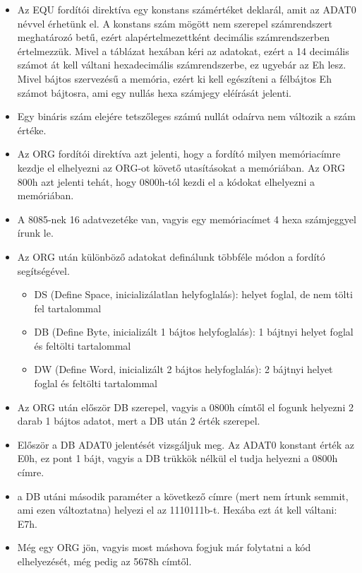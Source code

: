 \documentclass{article}
\begin{document}
\begin{itemize}
	\item Az EQU fordítói direktíva egy konstans számértéket deklarál, amit az ADAT0 névvel érhetünk el. A konstans szám mögött nem szerepel számrendszert meghatározó betű, ezért alapértelmezettként decimális számrendszerben értelmezzük. Mivel a táblázat hexában kéri az adatokat, ezért a 14 decimális számot át kell váltani hexadecimális számrendszerbe, ez ugyebár az Eh lesz. Mivel bájtos szervezésű a memória, ezért ki kell egészíteni a félbájtos Eh számot bájtosra, ami egy nullás hexa számjegy eléírását jelenti.
	\item \colorbox{orange!30}{Egy bináris szám elejére tetszőleges számú nullát odaírva nem változik a szám értéke.}
	\item Az ORG fordítói direktíva azt jelenti, hogy a fordító milyen memóriacímre kezdje el elhelyezni az ORG-ot követő utasításokat a memóriában. Az ORG 800h azt jelenti tehát, hogy 0800h-tól kezdi el a kódokat elhelyezni a memóriában.
	\item \colorbox{orange!30}{A 8085-nek 16 adatvezetéke van, vagyis egy memóriacímet 4 hexa számjeggyel írunk le.}
	\item Az ORG után különböző adatokat definálunk többféle módon a fordító segítségével.
	\begin{itemize}
		\item DS (Define Space, inicializálatlan helyfoglalás): helyet foglal, de nem tölti fel tartalommal
		\item DB (Define Byte, inicializált 1 bájtos helyfoglalás): 1 bájtnyi helyet foglal és feltölti tartalommal
		\item DW (Define Word, inicializált 2 bájtos helyfoglalás): 2 bájtnyi helyet foglal és feltölti tartalommal
	\end{itemize}
	\item Az ORG után először DB szerepel, vagyis a 0800h címtől el fogunk helyezni 2 darab 1 bájtos adatot, mert a DB után 2 érték szerepel.
	\item Először a DB ADAT0 jelentését vizsgáljuk meg. Az ADAT0 konstant érték az E0h, ez pont 1 bájt, vagyis a DB trükkök nélkül el tudja helyezni a 0800h címre.
	\item a DB utáni második paraméter a következő címre (mert nem írtunk semmit, ami ezen változtatna) helyezi el az 1110111b-t. Hexába ezt át kell váltani: E7h.
	\item Még egy ORG jön, vagyis most máshova fogjuk már folytatni a kód elhelyezését, még pedig az 5678h címtől.

\end{itemize}
\end{document}

